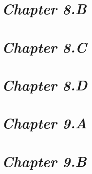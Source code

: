 \documentclass[a4paper,12pt]{article}
\begin{document}
    \newpage

    \section{\large \textit{Chapter 8.B}}

    

    \newpage

    \section{\large \textit{Chapter 8.C}}

    

    \newpage

    \section{\large \textit{Chapter 8.D}}

    

    \newpage

    \section{\large \textit{Chapter 9.A}}
    
    

    \newpage

    \section{\large \textit{Chapter 9.B}}

    
\end{document}
